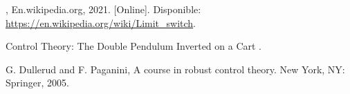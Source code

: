 %

%

\begin{flushleft}
\begin{thebibliography}{9}

, En.wikipedia.org, 2021. [Online]. Disponible: \href{https://en.wikipedia.org/wiki/Limit\_switch}{https://en.wikipedia.org/wiki/Limit\_switch}. 

Control Theory: The Double Pendulum Inverted on a Cart
.


G. Dullerud and F. Paganini, A course in robust control theory. New York, NY: Springer, 2005.
\end{thebibliography}
\end{flushleft}

%
